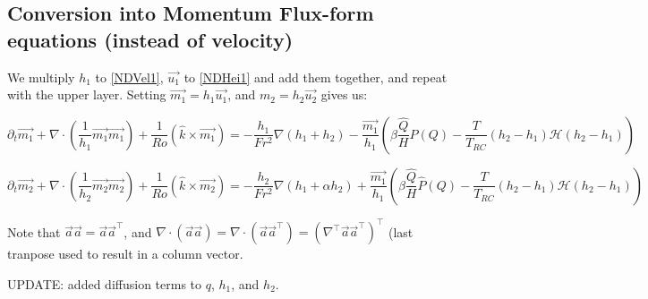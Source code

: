 \documentclass[10pt]{article}
\newcommand{\HH}{\mathcal{H}}
\begin{document}
\subsection{Conversion into Momentum Flux-form equations (instead of velocity)}
We multiply $h_1$ to  \ref{NDVel1}, $\vec{u_1}$ to \ref{NDHei1} and add them together, and repeat with the upper layer. Setting $\vec{m_1} = h_1\vec{u_1}$, and $m_2=h_2\vec{u_2}$ gives us:

\begin{equation}
\partial_t\vec{m_1} + \nabla \cdot \left(\frac{1}{h_1}\vec{m_1}\vec{m_1}\right) + \frac{1}{Ro}\left(\hat{k}\times \vec{m_1}\right) = -\frac{h_1}{Fr^2}\nabla\left(h_1 + h_2\right) -\frac{\vec{m_1}}{h_1} \left( \beta \frac{\hat{Q}}{H}\hat{P}(Q) - \frac{T}{T_{RC}}(h_2-h_1)\HH{(h_2-h_1)}\right)
\end{equation}

\begin{equation}
\partial_t\vec{m_2} + \nabla \cdot \left(\frac{1}{h_2}\vec{m_2}\vec{m_2}\right) + \frac{1}{Ro}\left(\hat{k}\times \vec{m_2}\right) = -\frac{h_2}{Fr^2}\nabla\left( h_1 + \alpha h_2\right)  +\frac{\vec{m_1}}{h_1} \left( \beta \frac{\hat{Q}}{H}\hat{P}(Q) - \frac{T}{T_{RC}}(h_2-h_1)\HH{(h_2-h_1)}\right)
\end{equation}

Note that $\vec{a}\vec{a} = \vec{a}\vec{a}^{\top}$, and $\nabla\cdot (\vec{a}\vec{a}) = \nabla \cdot (\vec{a}\vec{a}^{\top}) = \left(\nabla^{\top}\vec{a}\vec{a}^{\top}\right)^{\top}$ (last tranpose used to result in a column vector.

UPDATE: added diffusion terms to $q$, $h_1$, and $h_2$.
\end{document}
